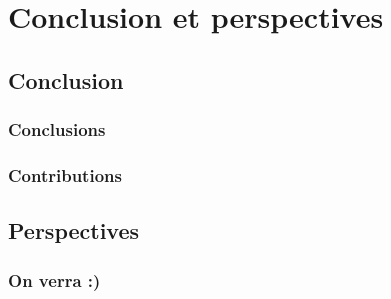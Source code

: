 
\chapter{Conclusion et perspectives} %
\PartialToc
\label{Chapter5} %


\section{Conclusion}
\subsection{Conclusions}
\subsection{Contributions}
\section{Perspectives}
\subsection{On verra :)}